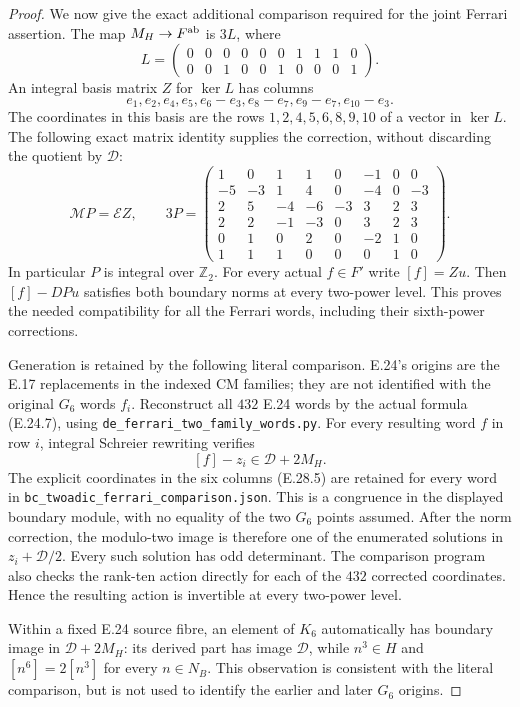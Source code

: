 \begin{proof}
We now give the exact additional comparison required for
the joint Ferrari assertion.  The map
$M_H\to F^{\rm ab}$ is $3L$, where
\[
 L=\begin{pmatrix}
 0&0&0&0&0&0&1&1&1&0\\
 0&0&1&0&0&1&0&0&0&1
 \end{pmatrix}.
 \tag{E.28.11}
\]
An integral basis matrix $Z$ for $\ker L$ has columns
\[
 e_1,e_2,e_4,e_5,e_6-e_3,e_8-e_7,e_9-e_7,e_{10}-e_3.
 \tag{E.28.12}
\]
The coordinates in this basis are the rows
$1,2,4,5,6,8,9,10$ of a vector in $\ker L$.
The following exact matrix identity supplies the correction,
without discarding the quotient by $\mathcal D$:
\[
 \mathcal M P=\mathcal E Z,\qquad
 3P=\begin{pmatrix}
 1&0&1&1&0&-1&0&0\\
 -5&-3&1&4&0&-4&0&-3\\
 2&5&-4&-6&-3&3&2&3\\
 2&2&-1&-3&0&3&2&3\\
 0&1&0&2&0&-2&1&0\\
 1&1&1&0&0&0&1&0
 \end{pmatrix}.
 \tag{E.28.13}
\]
In particular $P$ is integral over $\mathbb Z_2$.
For every actual $f\in F'$ write $[f]=Zu$.  Then
$[f]-DPu$ satisfies both boundary norms at every two-power
level.  This proves the needed compatibility for all the
Ferrari words, including their sixth-power corrections.

Generation is retained by the following literal comparison.
E.24's origins are the E.17 replacements in the indexed
CM families; they are not identified with the original
$G_6$ words $f_i$.  Reconstruct all $432$ E.24 words by
the actual formula (E.24.7), using
\texttt{de\_ferrari\_two\_family\_words.py}.
For every resulting word $f$ in row $i$, integral
Schreier rewriting verifies
\[
                 [f]-z_i\in\mathcal D+2M_H.
 \tag{E.28.13a}
\]
The explicit coordinates in the six columns (E.28.5)
are retained for every word in
\texttt{bc\_twoadic\_ferrari\_comparison.json}.
This is a congruence in the displayed boundary module,
with no equality of the two $G_6$ points assumed.
After the norm correction, the modulo-two image is
therefore one of the enumerated solutions in
$z_i+\mathcal D/2$.  Every such solution has odd
determinant.  The comparison program also checks
the rank-ten action directly for each of the $432$
corrected coordinates.  Hence the resulting action
is invertible at every two-power level.

Within a fixed E.24 source fibre, an element of $K_6$
automatically has boundary image in
$\mathcal D+2M_H$: its derived part has image
$\mathcal D$, while $n^3\in H$ and
$[n^6]=2[n^3]$ for every $n\in N_B$.
This observation is consistent with the literal
comparison, but is not used to identify the
earlier and later $G_6$ origins.


\end{proof}
